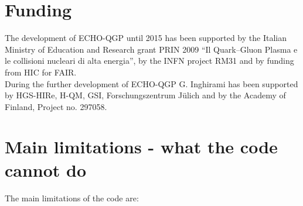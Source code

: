 \section{Funding}
The development of ECHO-QGP until 2015 has been supported by the Italian
Ministry of Education and Research grant PRIN 2009 ``Il Quark–Gluon
Plasma e le collisioni nucleari di alta energia'', by the INFN project
RM31 and by funding from HIC for FAIR.\\
During the further development of ECHO-QGP G. Inghirami has been supported by HGS-HIRe, H-QM, GSI, Forschungszentrum Jülich and by the Academy of Finland, Project no. 297058.\\

\section{Main limitations - what the code cannot do}
The main limitations of the code are:\\
